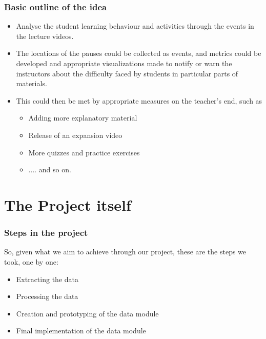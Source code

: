 \documentclass[12pt,xcolor=dvipsnames]{beamer}
\begin{document}
\begin{frame}[t]
\frametitle{Basic outline of the idea}

\begin{itemize}
\item Analyse the student learning behaviour and activities through the events in the lecture videos.
\item The locations of the pauses could be collected as events, and metrics could be developed and appropriate visualizations made to notify or warn the instructors about the difficulty faced by students in particular parts of materials.
\item This could then be met by appropriate measures on the teacher's end, such as

\begin{itemize}
\item Adding more explanatory material
\item Release of an expansion video
\item More quizzes and practice exercises
\item .... and so on.
\end{itemize}

\end{itemize}
\end{frame}


\section{The Project itself}
\begin{frame}[t]
\frametitle{Steps in the project}

So, given what we aim to achieve through our project, these are the steps we took, one by one:

\begin{itemize}
\item Extracting the data
\item Processing the data
\item Creation and prototyping of the data module
\item Final implementation of the data module
\end{itemize}

\end{frame}
\end{document}
